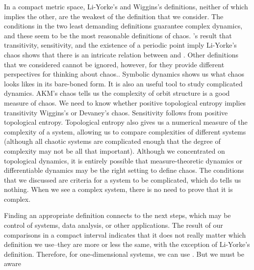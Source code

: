 \documentclass[10pt,twoside,draft]{book}
\begin{document}
In a compact metric space, Li-Yorke's and Wiggins's definitions, neither of which implies the other, are the weakest of the definition that we consider.
The conditions in the two least demanding definitions guarantee complex dynamics, and these seem to be the most reasonable definitions of chaos.
\citet{mai}'s result that transitivity, sensitivity, and the existence of a periodic point imply Li-Yorke's chaos shows that there is an intricate relation between \liy and \wig.
Other definitions that we considered cannot be ignored, however, for they provide different perspectives for thinking about chaos..
Symbolic dynamics shows us what chaos looks likes in its bare-boned form.
It is also an useful tool to study complicated dynamics.
AKM's chaos tells us the complexity of orbit structure is a good measure of chaos.
We need to know whether positive topological entropy implies transitivity  Wiggins's or Devaney's chaos.
Sensitivity follows from positive topological entropy.
Topological entropy also gives us a numerical measure of the complexity of a system, allowing us to compare complexities of different systems (although all chaotic systems are complicated enough that the degree of complexity may not be all that important).
Although we concentrated on topological dynamics, it is entirely possible that measure-theoretic dynamics or differentiable dynamics may be the right setting to define chaos.
The conditions that we discussed are criteria for a system to be complicated, which do tells us nothing.
When we see a complex system, there is no need to prove that it is complex.

Finding an appropriate definition connects to the next steps, which may be control of systems, data analysis, or other applications.
The result of our comparisons in a compact interval indicates that it does not really matter which definition we use--they are more or less the same, with the exception of Li-Yorke's definition.
Therefore, for one-dimensional systems, we can use .
But we must be aware



\end{document}
